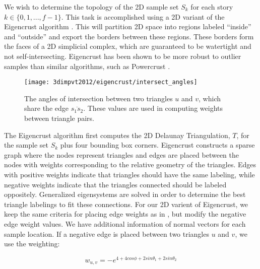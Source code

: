 \documentclass[12pt,onecolumn,oneside]{book}
\begin{document}
We wish to determine the topology of the 2D sample set $S_k$ for each story $k \in \{ 0, 1, ..., f-1 \}$.  This task is accomplished using a 2D variant of the Eigencrust algorithm \cite{EigencrustShewchuk}.  This will partition 2D space into regions labeled ``inside'' and ``outside'' and export the borders between these regions.  These borders form the faces of a 2D simplicial complex, which are guaranteed to be watertight and not self-intersecting.  Eigencrust has been shown to be more robust to outlier samples than similar algorithms, such as Powercrust \cite{EigencrustShewchuk, Powercrust}.

\begin{figure}[t]

\begin{minipage}[b]{1.0\linewidth}
  \centering
  \centerline{\texttt{[image: 3dimpvt2012/eigencrust/intersect\_angles]}}
\end{minipage}

\caption[Computing weighting between triangle pairs.]{The angles of intersection between two triangles $u$ and $v$, which share the edge $\overline{s_1 s_2}$. These values are used in computing weights between triangle pairs.}
\label{fig:intersect_angles}

\end{figure}

The Eigencrust algorithm first computes the 2D Delaunay Triangulation, $T$, for the sample set $S_k$ plus four bounding box corners.  Eigencrust constructs a sparse graph where the nodes represent triangles and edges are placed between the nodes with weights corresponding to the relative geometry of the triangles.  Edges with positive weights indicate that triangles should have the same labeling, while negative weights indicate that the triangles connected should be labeled oppositely.  Generalized eigensystems are solved in order to determine the best triangle labelings to fit these connections.  For our 2D varient of Eigencrust, we keep the same criteria for placing edge weights as in \cite{EigencrustShewchuk}, but modify the negative edge weight values.  We have additional information of normal vectors for each sample location. If a negative edge is placed between two triangles $u$ and $v$, we use the weighting:

\begin{equation}
w_{u,v} = - e ^ {4 + 4 cos \phi + 2 sin \theta_1 + 2 sin \theta_2}
\label{neg_edge_weight}
\end{equation}
\end{document}
